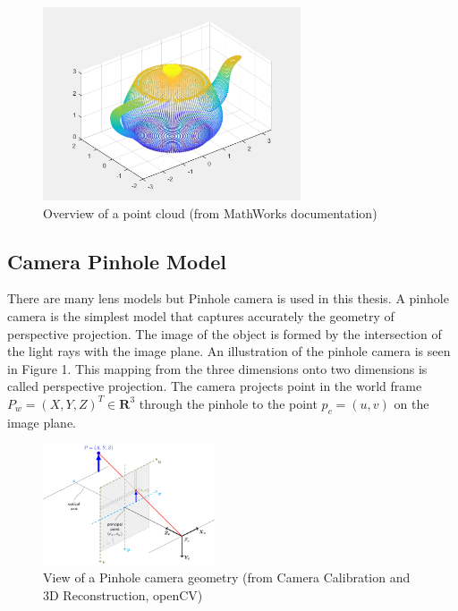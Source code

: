 \begin{figure}[!h]
\begin{center}
\includegraphics[width=3in]{figures02/pcd.png}
\caption{Overview of a point cloud (from MathWorks documentation)}%
\end{center}
\label{fig2:mypicture3}
\end{figure}


\subsection{ Camera Pinhole Model}
There are many lens models but Pinhole camera is used in this thesis. A pinhole camera is the simplest model that captures accurately the geometry of perspective projection. The image of the object is formed by the intersection of the light rays with the image plane. An illustration of the pinhole camera is seen in  Figure 1. This mapping from the three dimensions onto two dimensions is called perspective projection. The camera projects point in the world frame $ P_{w}=(X,Y,Z)^{T} \in \textbf{R}^{3}$ through the pinhole to  the point $p_{c}=(u,v)$ on the image plane.
 
\begin{figure}[!h]
\begin{center}
\includegraphics[width=2in]{figures02/pinhole_camera_model.png}
\caption{View of a Pinhole camera geometry (from Camera Calibration and 3D Reconstruction, openCV)}%
\end{center}
\end{figure}

